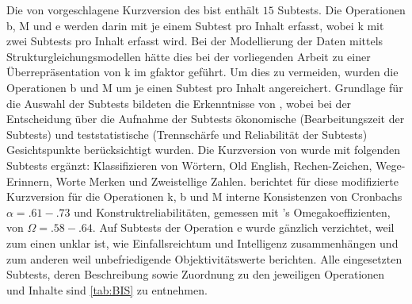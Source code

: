 \documentclass[11pt, twoside, a4paper]{book}		%
\begin{document}
Die von \citet{Jaeger1997} vorgeschlagene Kurzversion des \gls{bist} enthält $15$ Subtests. Die Operationen \gls{b}, \gls{M} und \gls{e} werden darin mit je einem Subtest pro Inhalt erfasst, wobei \gls{k} mit zwei Subtests pro Inhalt erfasst wird. Bei der Modellierung der Daten mittels Strukturgleichungsmodellen hätte dies bei der vorliegenden Arbeit zu einer Überrepräsentation von \gls{k} im \gls{gfaktor} geführt. Um dies zu vermeiden, wurden die Operationen \gls{b} und \gls{M} um je einen Subtest pro Inhalt angereichert. Grundlage für die Auswahl der Subtests bildeten die Erkenntnisse von \citet{Wicki2014}, wobei bei der Entscheidung über die Aufnahme der Subtests ökonomische (Bearbeitungszeit der Subtests) und teststatistische (Trennschärfe und Reliabilität der Subtests)  Gesichtspunkte berücksichtigt wurden. Die Kurzversion von \citet{Jaeger1997} wurde mit folgenden Subtests ergänzt: Klassifizieren von Wörtern, Old English, Rechen-Zeichen, Wege-Erinnern, Worte Merken und Zweistellige Zahlen. 
\citet{Wicki2014} berichtet für diese modifizierte Kurzversion für die Operationen \gls{k}, \gls{b} und \gls{M} interne Konsistenzen von Cronbachs $\alpha=.61-.73$ und Konstruktreliabilitäten, gemessen mit \citeauthor{McDonald1999}'s \citeyearpar{McDonald1999} Omegakoeffizienten, von $\Omega = .58-.64$.
Auf Subtests der Operation \gls{e} wurde gänzlich verzichtet, weil zum einen unklar ist, wie Einfallsreichtum und Intelligenz zusammenhängen \citep{Kim2005} und zum anderen weil \citet{Jaeger1997} unbefriedigende Objektivitätswerte berichten. 
Alle eingesetzten Subtests, deren Beschreibung sowie Zuordnung zu den jeweiligen Operationen und Inhalte sind \autoref{tab:BIS} zu entnehmen.
\end{document}
